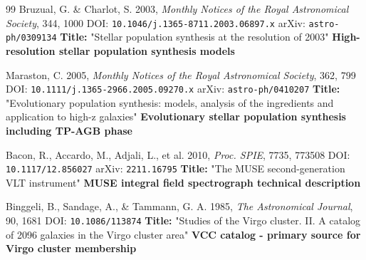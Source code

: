 \begin{thebibliography}{99}
Bruzual, G. \& Charlot, S. 2003, \textit{Monthly Notices of the Royal Astronomical Society}, 344, 1000
\newline DOI: \texttt{10.1046/j.1365-8711.2003.06897.x}
\newline arXiv: \texttt{astro-ph/0309134}
\newline \textbf{Title:} "Stellar population synthesis at the resolution of 2003"
\newline \textbf{High-resolution stellar population synthesis models}

Maraston, C. 2005, \textit{Monthly Notices of the Royal Astronomical Society}, 362, 799
\newline DOI: \texttt{10.1111/j.1365-2966.2005.09270.x}
\newline arXiv: \texttt{astro-ph/0410207}
\newline \textbf{Title:} "Evolutionary population synthesis: models, analysis of the ingredients and application to high-z galaxies"
\newline \textbf{Evolutionary stellar population synthesis including TP-AGB phase}


Bacon, R., Accardo, M., Adjali, L., et al. 2010, \textit{Proc. SPIE}, 7735, 773508
\newline DOI: \texttt{10.1117/12.856027}
\newline arXiv: \texttt{2211.16795}
\newline \textbf{Title:} "The MUSE second-generation VLT instrument"
\newline \textbf{MUSE integral field spectrograph technical description}


Binggeli, B., Sandage, A., \& Tammann, G. A. 1985, \textit{The Astronomical Journal}, 90, 1681
\newline DOI: \texttt{10.1086/113874}
\newline \textbf{Title:} "Studies of the Virgo cluster. II. A catalog of 2096 galaxies in the Virgo cluster area"
\newline \textbf{VCC catalog - primary source for Virgo cluster membership}


\end{thebibliography}
